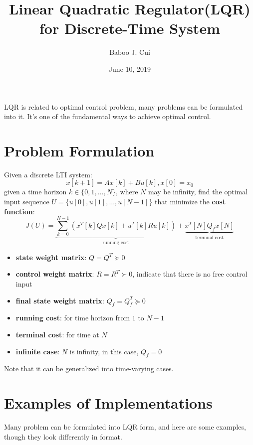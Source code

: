 \documentclass[10pt,a4paper,oneside]{article}
\date{June 10, 2019}
\author{Baboo J. Cui}
\title{Linear Quadratic Regulator(LQR) for Discrete-Time System}
\begin{document}
\maketitle
\tableofcontents

\newpage

LQR is related to optimal control problem, many problems can be formulated into it. It's one of the fundamental ways to achieve optimal control.

\section{Problem Formulation}
Given a discrete LTI system:
\[
x[k+1] = Ax[k] + Bu[k], x[0] = x_0
\]
given a time horizon $k \in \{0, 1, \dots, N\}$, where $N$ may be infinity, find the optimal input sequence $U = \{u[0], u[1], \dots, u[N-1]\}$ that minimize the \textbf{cost function}:
\[
J(U) = \underbrace{\sum_{k=0}^{N-1}\left(x^T[k] Qx[k] +u^T[k] Ru[k]\right)}_{\text{running cost}} + \underbrace{x^T[N]Q_f x[N]}_{\text{terminal cost}}
\]

\begin{itemize}
	\item \textbf{state weight matrix}: $Q = Q^T \succeq 0$
	\item \textbf{control weight matrix}: $R = R^T \succ 0$, indicate that there is no free control input
	\item \textbf{final state weight matrix}: $Q_f = Q_f^T \succeq 0$
	\item \textbf{running cost}: for time horizon from $1$ to $N-1$
	\item \textbf{terminal cost}: for time at $N$
	\item \textbf{infinite case}: $N$ is infinity, in this case, $Q_f = 0$
\end{itemize}
Note that it can be generalized into time-varying cases.

\section{Examples of Implementations}
Many problem can be formulated into LQR form, and here are some examples, though they look differently in format.
\end{document}
